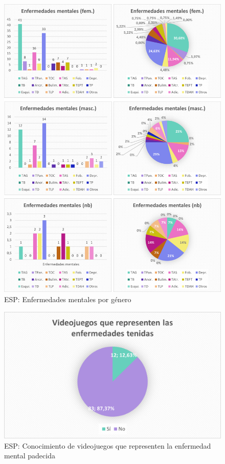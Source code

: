 \documentclass[12pt, a4paper,twoside,titlepage]{book}
\begin{document}
\begin{figure}
    \centering
    \includegraphics[width=1\linewidth]{ANEXO ESP/26AnexESPEnf}
    \caption{ESP: Enfermedades mentales por género}
    
\end{figure}

\begin{figure}
    \centering
    \includegraphics[width=.8\linewidth]{ANEXO ESP/27AnexESPEnftenidas}
    \caption{ESP: Conocimiento de videojuegos que representen la enfermedad mental padecida}
    \label{fig:ESPVidenf}
\end{figure}
\end{document}
